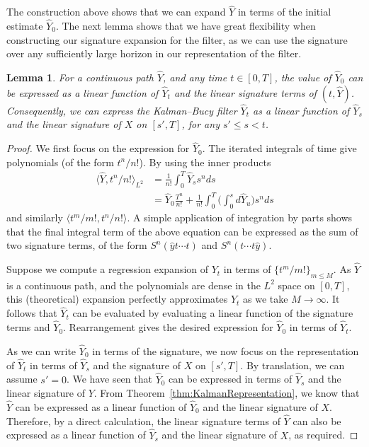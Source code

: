 \documentclass[a4paper, 12pt]{article}
\newtheorem{lemma}{Lemma}
\theoremstyle{remark}
\begin{document}
The construction above shows that we can expand $\hat Y$ in terms of the initial estimate $\hat Y_0$. The next lemma shows that we have great flexibility when constructing our signature expansion for the filter, as we can use the signature over any sufficiently large horizon in our representation of the filter.
\begin{lemma}\label{lemma:longerwindow}
For a continuous path $\hat Y$, and any time $t\in [0,T]$, the value of $\hat Y_0$ can be expressed as a linear function of $\hat Y_t$ and the linear signature terms of $(t, \hat Y)$. Consequently, we can express the Kalman--Bucy filter $\hat Y_t$ as a linear function of $\hat Y_s$ and the linear signature of $X$ on $[s',T]$, for any $s'\leq s < t$.
\end{lemma}
\begin{proof}
We first focus on the expression for $\hat Y_0$. The iterated integrals of time give polynomials (of the form $t^n/n!$). By using the inner products
\begin{align*}
   \langle \hat Y, t^n/n!\rangle_{L^2} &= \frac{1}{n!}\int_0^T \hat Y_s s^n ds\\
   &= \hat Y_0 \frac{T^n}{n!} + \frac{1}{n!}\int_0^T \Big(\int_0^s d\hat Y_u\Big)s^n ds
\end{align*}
and similarly $\langle t^m/m!, t^n/n!\rangle$.
A simple application of integration by parts shows that the final integral term of the above equation can be expressed as the sum of two signature terms, of the form $S^n(\hat yt\cdots t)$ and $S^n(t\cdots t\hat y)$.

Suppose we compute a regression expansion of \(Y_t\) in terms of \(\{t^m/m! \}_{m \leq M}\).
As $\hat Y$ is a continuous path, and the polynomials are dense in the $L^2$ space on $[0,T]$, 
this (theoretical) expansion perfectly approximates \(Y_t\) as we take \(M \to \infty\).
It follows that $\hat Y_t$ can be evaluated by evaluating a linear function of the signature terms and $\hat Y_0$. Rearrangement gives the desired expression for $\hat Y_0$ in terms of $\hat Y_t$.

As we can write $\hat Y_0$ in terms of the signature, we now focus on the representation of $\hat Y_t$ in terms of $\hat Y_s$ and the signature of $X$ on $[s', T]$. By translation, we can assume $s'=0$. We have seen that $\hat Y_0$ can be expressed in terms of $\hat Y_s$ and the linear signature of $Y$. From Theorem~\ref{thm:KalmanRepresentation}, we know that $\hat Y$ can be expressed as a linear function of $\hat Y_0$ and the linear signature of $X$. Therefore, by a direct calculation, the linear signature terms of $\hat{Y}$ can also be expressed as a linear function of $\hat Y_s$ and the linear signature of $X$, as required.
\end{proof}
\end{document}

